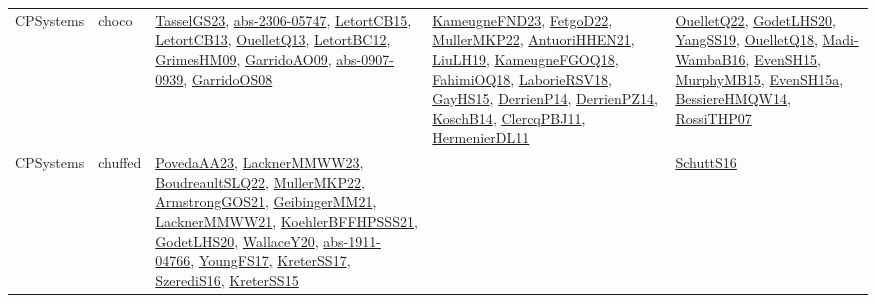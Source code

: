 {\begin{longtable}{lp{3cm}>{\raggedright}p{6cm}>{\raggedright}p{6cm}p{8cm}}
CPSystems & choco & \href{papers/TasselGS23.pdf}{TasselGS23}\cite{TasselGS23}, \href{articles/abs-2306-05747.pdf}{abs-2306-05747}\cite{abs-2306-05747}, \href{articles/LetortCB15.pdf}{LetortCB15}\cite{LetortCB15}, \href{papers/LetortCB13.pdf}{LetortCB13}\cite{LetortCB13}, \href{papers/OuelletQ13.pdf}{OuelletQ13}\cite{OuelletQ13}, \href{papers/LetortBC12.pdf}{LetortBC12}\cite{LetortBC12}, \href{papers/GrimesHM09.pdf}{GrimesHM09}\cite{GrimesHM09}, \href{articles/GarridoAO09.pdf}{GarridoAO09}\cite{GarridoAO09}, \href{articles/abs-0907-0939.pdf}{abs-0907-0939}\cite{abs-0907-0939}, \href{articles/GarridoOS08.pdf}{GarridoOS08}\cite{GarridoOS08} & \href{papers/KameugneFND23.pdf}{KameugneFND23}\cite{KameugneFND23}, \href{articles/FetgoD22.pdf}{FetgoD22}\cite{FetgoD22}, \href{articles/MullerMKP22.pdf}{MullerMKP22}\cite{MullerMKP22}, \href{papers/AntuoriHHEN21.pdf}{AntuoriHHEN21}\cite{AntuoriHHEN21}, \href{papers/LiuLH19.pdf}{LiuLH19}\cite{LiuLH19}, \href{papers/KameugneFGOQ18.pdf}{KameugneFGOQ18}\cite{KameugneFGOQ18}, \href{articles/FahimiOQ18.pdf}{FahimiOQ18}\cite{FahimiOQ18}, \href{articles/LaborieRSV18.pdf}{LaborieRSV18}\cite{LaborieRSV18}, \href{papers/GayHS15.pdf}{GayHS15}\cite{GayHS15}, \href{papers/DerrienP14.pdf}{DerrienP14}\cite{DerrienP14}, \href{papers/DerrienPZ14.pdf}{DerrienPZ14}\cite{DerrienPZ14}, \href{papers/KoschB14.pdf}{KoschB14}\cite{KoschB14}, \href{papers/ClercqPBJ11.pdf}{ClercqPBJ11}\cite{ClercqPBJ11}, \href{papers/HermenierDL11.pdf}{HermenierDL11}\cite{HermenierDL11} & \href{papers/OuelletQ22.pdf}{OuelletQ22}\cite{OuelletQ22}, \href{papers/GodetLHS20.pdf}{GodetLHS20}\cite{GodetLHS20}, \href{papers/YangSS19.pdf}{YangSS19}\cite{YangSS19}, \href{papers/OuelletQ18.pdf}{OuelletQ18}\cite{OuelletQ18}, \href{papers/Madi-WambaB16.pdf}{Madi-WambaB16}\cite{Madi-WambaB16}, \href{papers/EvenSH15.pdf}{EvenSH15}\cite{EvenSH15}, \href{papers/MurphyMB15.pdf}{MurphyMB15}\cite{MurphyMB15}, \href{articles/EvenSH15a.pdf}{EvenSH15a}\cite{EvenSH15a}, \href{papers/BessiereHMQW14.pdf}{BessiereHMQW14}\cite{BessiereHMQW14}, \href{papers/RossiTHP07.pdf}{RossiTHP07}\cite{RossiTHP07}\\
CPSystems & chuffed & \href{papers/PovedaAA23.pdf}{PovedaAA23}\cite{PovedaAA23}, \href{articles/LacknerMMWW23.pdf}{LacknerMMWW23}\cite{LacknerMMWW23}, \href{papers/BoudreaultSLQ22.pdf}{BoudreaultSLQ22}\cite{BoudreaultSLQ22}, \href{articles/MullerMKP22.pdf}{MullerMKP22}\cite{MullerMKP22}, \href{papers/ArmstrongGOS21.pdf}{ArmstrongGOS21}\cite{ArmstrongGOS21}, \href{papers/GeibingerMM21.pdf}{GeibingerMM21}\cite{GeibingerMM21}, \href{papers/LacknerMMWW21.pdf}{LacknerMMWW21}\cite{LacknerMMWW21}, \href{articles/KoehlerBFFHPSSS21.pdf}{KoehlerBFFHPSSS21}\cite{KoehlerBFFHPSSS21}, \href{papers/GodetLHS20.pdf}{GodetLHS20}\cite{GodetLHS20}, \href{articles/WallaceY20.pdf}{WallaceY20}\cite{WallaceY20}, \href{articles/abs-1911-04766.pdf}{abs-1911-04766}\cite{abs-1911-04766}, \href{papers/YoungFS17.pdf}{YoungFS17}\cite{YoungFS17}, \href{articles/KreterSS17.pdf}{KreterSS17}\cite{KreterSS17}, \href{papers/SzerediS16.pdf}{SzerediS16}\cite{SzerediS16}, \href{papers/KreterSS15.pdf}{KreterSS15}\cite{KreterSS15} &  & \href{papers/SchuttS16.pdf}{SchuttS16}\cite{SchuttS16}\\

\end{longtable}}
